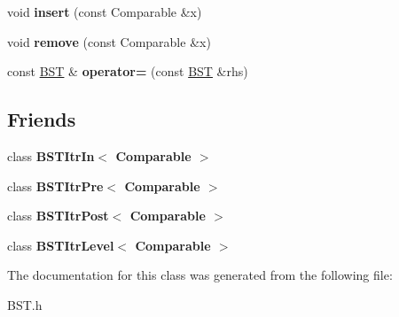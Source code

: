 \begin{DoxyCompactItemize}
\item 
void {\bfseries insert} (const Comparable \&x)\hypertarget{class_b_s_t_a2b117df6521c7d61dac75ff2c938bae7}{}\label{class_b_s_t_a2b117df6521c7d61dac75ff2c938bae7}

\item 
void {\bfseries remove} (const Comparable \&x)\hypertarget{class_b_s_t_a6f01a0b44daf82a42022b6eb4c0df7a2}{}\label{class_b_s_t_a6f01a0b44daf82a42022b6eb4c0df7a2}

\item 
const \hyperlink{class_b_s_t}{B\+ST} \& {\bfseries operator=} (const \hyperlink{class_b_s_t}{B\+ST} \&rhs)\hypertarget{class_b_s_t_aa80c39f454c89d4a202be3d1445823f3}{}\label{class_b_s_t_aa80c39f454c89d4a202be3d1445823f3}

\end{DoxyCompactItemize}
\subsection*{Friends}
\begin{DoxyCompactItemize}
\item 
class {\bfseries B\+S\+T\+Itr\+In$<$ Comparable $>$}\hypertarget{class_b_s_t_aab3993acac2ab24a0b59edb0c3acc775}{}\label{class_b_s_t_aab3993acac2ab24a0b59edb0c3acc775}

\item 
class {\bfseries B\+S\+T\+Itr\+Pre$<$ Comparable $>$}\hypertarget{class_b_s_t_a45a55df6f11541416d4ea7684c575c1a}{}\label{class_b_s_t_a45a55df6f11541416d4ea7684c575c1a}

\item 
class {\bfseries B\+S\+T\+Itr\+Post$<$ Comparable $>$}\hypertarget{class_b_s_t_a5dc153694be266f6e772659486219da7}{}\label{class_b_s_t_a5dc153694be266f6e772659486219da7}

\item 
class {\bfseries B\+S\+T\+Itr\+Level$<$ Comparable $>$}\hypertarget{class_b_s_t_a26ff00bc0d87069aed877f10fd3c80a8}{}\label{class_b_s_t_a26ff00bc0d87069aed877f10fd3c80a8}

\end{DoxyCompactItemize}


The documentation for this class was generated from the following file\+:\begin{DoxyCompactItemize}
\item 
B\+S\+T.\+h\end{DoxyCompactItemize}
